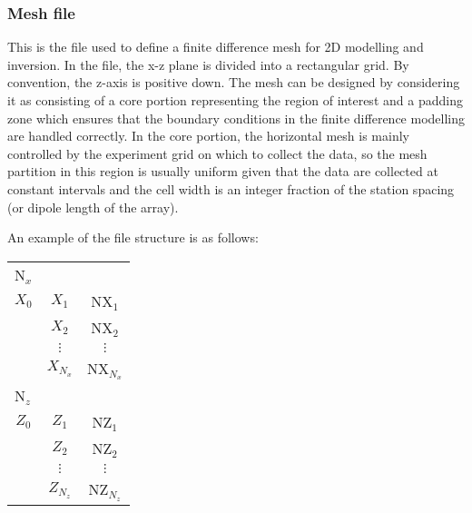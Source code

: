 \subsubsection{Mesh file}

This is the file used to define a finite difference mesh for 2D modelling and inversion. In the file, the x-z plane is divided into a rectangular grid. By convention, the z-axis is positive down. The mesh can be designed by considering it as consisting of a core portion representing the region of interest and a padding zone which ensures that the boundary conditions in the finite difference modelling are handled correctly. In the core portion, the horizontal mesh is mainly controlled by the experiment grid on which to collect the data, so the mesh partition in this region is usually uniform given that the data are collected at constant intervals and the cell width is an integer fraction of the station spacing (or dipole length of the array). 

An example of the  file structure is as follows:

\begin{fileExample}
\begin{tabular}{|ccc|}
\hline
\multicolumn{3}{|l|}{N$_x$} \\
$X_0$ & $X_1$ & NX$_1$ \\
 & $X_2$ & NX$_2$ \\
 & $\vdots$ & $\vdots$\\
 & $X_{N_x}$ & NX$_{N_x}$ \\
\multicolumn{3}{|l|}{N$_z$} \\
$Z_0$ & $Z_1$ & NZ$_1$	\\
 & $Z_2$ & NZ$_2$ \\
 & $\vdots$ & $\vdots$\\
 & $Z_{N_z}$ & NZ$_{N_z}$ \\
\hline
\end{tabular}
\end{fileExample}

